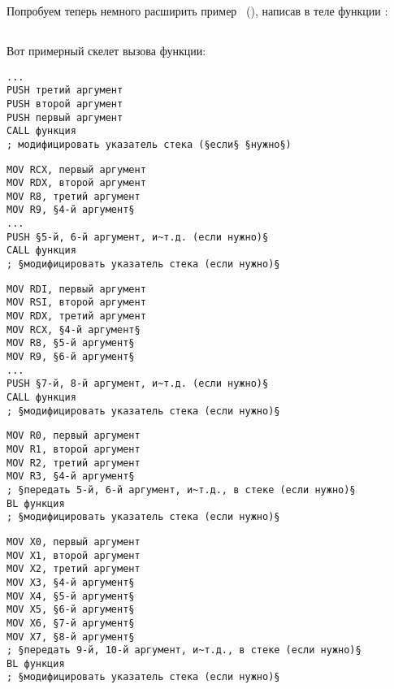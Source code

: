 \mysection{\PrintfSeveralArgumentsSectionName}

Попробуем теперь немного расширить пример \IT{\HelloWorldSectionName}~(),
написав в теле функции \main:







\subsection{\Conclusion{}}

Вот примерный скелет вызова функции:

\begin{lstlisting}[caption=x86,style=customasmx86]
...
PUSH третий аргумент
PUSH второй аргумент
PUSH первый аргумент
CALL функция
; модифицировать указатель стека (§если§ §нужно§)
\end{lstlisting}

\begin{lstlisting}[caption=x64 (MSVC),style=customasmx86]
MOV RCX, первый аргумент
MOV RDX, второй аргумент
MOV R8, третий аргумент
MOV R9, §4-й аргумент§
...
PUSH §5-й, 6-й аргумент, и~т.д. (если нужно)§
CALL функция
; §модифицировать указатель стека (если нужно)§
\end{lstlisting}

\begin{lstlisting}[caption=x64 (GCC),style=customasmx86]
MOV RDI, первый аргумент
MOV RSI, второй аргумент
MOV RDX, третий аргумент
MOV RCX, §4-й аргумент§
MOV R8, §5-й аргумент§
MOV R9, §6-й аргумент§
...
PUSH §7-й, 8-й аргумент, и~т.д. (если нужно)§
CALL функция
; §модифицировать указатель стека (если нужно)§
\end{lstlisting}

\begin{lstlisting}[caption=ARM,style=customasmARM]
MOV R0, первый аргумент
MOV R1, второй аргумент
MOV R2, третий аргумент
MOV R3, §4-й аргумент§
; §передать 5-й, 6-й аргумент, и~т.д., в стеке (если нужно)§
BL функция
; §модифицировать указатель стека (если нужно)§
\end{lstlisting}

\begin{lstlisting}[caption=ARM64,style=customasmARM]
MOV X0, первый аргумент
MOV X1, второй аргумент
MOV X2, третий аргумент
MOV X3, §4-й аргумент§
MOV X4, §5-й аргумент§
MOV X5, §6-й аргумент§
MOV X6, §7-й аргумент§
MOV X7, §8-й аргумент§
; §передать 9-й, 10-й аргумент, и~т.д., в стеке (если нужно)§
BL функция
; §модифицировать указатель стека (если нужно)§
\end{lstlisting}

